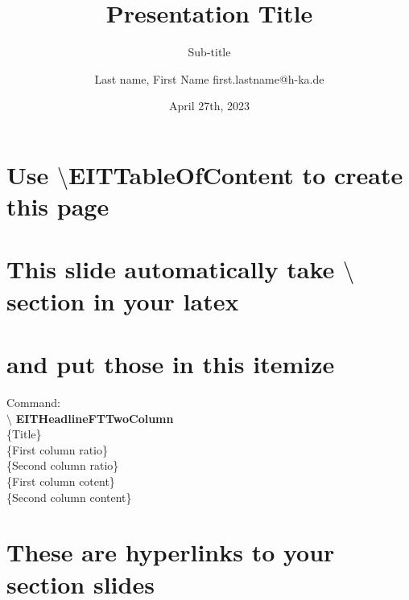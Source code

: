 \documentclass[t, aspectratio=169, xcolor=table]{beamer}
\title[Short Title] %
{Presentation Title}
\subtitle{Sub-title}
\author[Last Name, First name] %
{Last name, First Name
first.lastname@h-ka.de}
\date[April 27th, 2023] %
{April 27th, 2023}
\begin{document}


\section{Use $\setminus$EITTableOfContent to create this page}

\EITTableOfContent{}{}

\section{This slide automatically take $\setminus$section in your latex}

\section{and put those in this itemize}
{
    Command: \\$\setminus$ \textbf{EITHeadlineFTTwoColumn}\\
    \{Title\}\\
    \{First column ratio\}\\
    \{Second column ratio\}\\
    \{First column cotent\}\\
    \{Second column content\}
}
{
    \lipsum[2]
}

\section{These are hyperlinks to your section slides}
\end{document}
